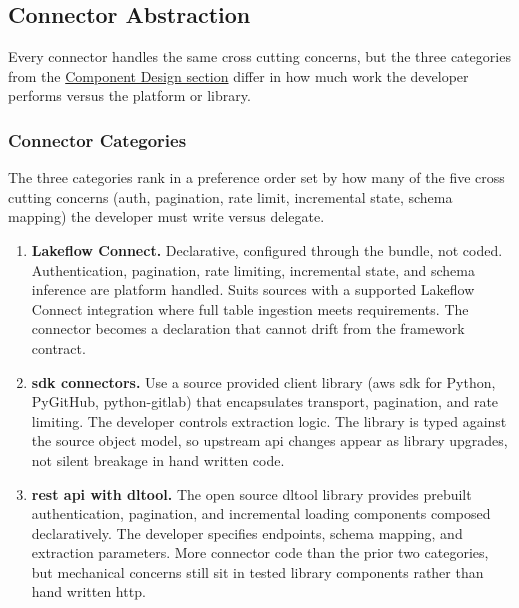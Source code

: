 


\subsection{Connector Abstraction}
\label{sec:connector-abstraction}

Every connector handles the same cross cutting concerns, but the three categories from the \hyperref[sec:component-design]{Component Design section} differ in how much work the developer performs versus the platform or library.

\subsubsection{Connector Categories}

The three categories rank in a preference order set by how many of the five cross cutting concerns (auth, pagination, rate limit, incremental state, schema mapping) the developer must write versus delegate.

\begin{enumerate}
    \item \textbf{Lakeflow Connect.} Declarative, configured through the bundle, not coded. Authentication, pagination, rate limiting, incremental state, and schema inference are platform handled. Suits sources with a supported Lakeflow Connect integration where full table ingestion meets requirements. The connector becomes a declaration that cannot drift from the framework contract.
    \item \textbf{\Gls{sdk} connectors.} Use a source provided client library (\gls{aws} \gls{sdk} for Python, PyGitHub, python-gitlab) that encapsulates transport, pagination, and rate limiting. The developer controls extraction logic. The library is typed against the source object model, so upstream \gls{api} changes appear as library upgrades, not silent breakage in hand written code.
    \item \textbf{\Gls{rest} \gls{api} with \gls{dltool}.} The open source \gls{dltool} library provides prebuilt authentication, pagination, and incremental loading components composed declaratively. The developer specifies endpoints, schema mapping, and extraction parameters. More connector code than the prior two categories, but mechanical concerns still sit in tested library components rather than hand written \gls{http}.
\end{enumerate}

